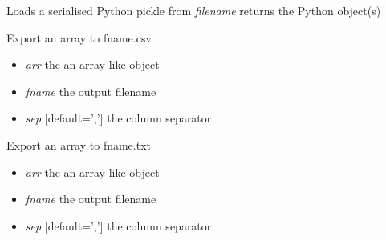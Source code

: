 \documentclass[a4paper,11pt,english]{sphinxmanual}
\begin{document}

\begin{fulllineitems}
\label{modules_doc:cbmpy.CBTools.deSerializeFromDisk}
Loads a serialised Python pickle from \emph{filename} returns the Python object(s)

\end{fulllineitems}


\begin{fulllineitems}
\label{modules_doc:cbmpy.CBTools.exportArray2CSV}
Export an array to fname.csv
\begin{itemize}
\item {} 
\emph{arr} the an array like object

\item {} 
\emph{fname} the output filename

\item {} 
\emph{sep} {[}default=','{]} the column separator

\end{itemize}

\end{fulllineitems}


\begin{fulllineitems}
\label{modules_doc:cbmpy.CBTools.exportArray2TXT}
Export an array to fname.txt
\begin{itemize}
\item {} 
\emph{arr} the an array like object

\item {} 
\emph{fname} the output filename

\item {} 
\emph{sep} {[}default=','{]} the column separator

\end{itemize}

\end{fulllineitems}

\end{document}
